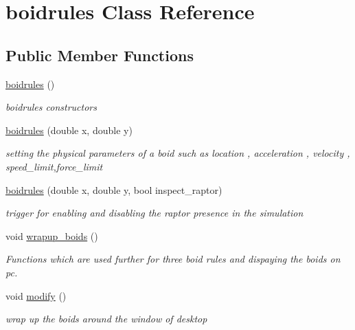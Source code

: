 \hypertarget{classboidrules}{}\section{boidrules Class Reference}
\label{classboidrules}
\subsection*{Public Member Functions}
\begin{DoxyCompactItemize}
\item 
\mbox{\hyperlink{classboidrules_a0fa44ded12febb8a903073fad1205e5b}{boidrules}} ()
\begin{DoxyCompactList}\small\item\em boidrules constructors \end{DoxyCompactList}\item 
\mbox{\label{classboidrules_a3fc6820f3caaf98bfec67c496785ef7d}} 
\mbox{\hyperlink{classboidrules_a3fc6820f3caaf98bfec67c496785ef7d}{boidrules}} (double x, double y)
\begin{DoxyCompactList}\small\item\em setting the physical parameters of a boid such as location , acceleration , velocity , speed\+\_\+limit,force\+\_\+limit \end{DoxyCompactList}\item 
\mbox{\label{classboidrules_ae1c37124f0905e6ae29868a624bcf54b}} 
\mbox{\hyperlink{classboidrules_ae1c37124f0905e6ae29868a624bcf54b}{boidrules}} (double x, double y, bool inspect\+\_\+raptor)
\begin{DoxyCompactList}\small\item\em trigger for enabling and disabling the raptor presence in the simulation \end{DoxyCompactList}\item 
void \mbox{\hyperlink{classboidrules_adeeb0bcb15cc3461fc521ce416d3266e}{wrapup\+\_\+boids}} ()
\begin{DoxyCompactList}\small\item\em Functions which are used further for three boid rules and dispaying the boids on pc. \end{DoxyCompactList}\item 
void \mbox{\hyperlink{classboidrules_a6d350244d405926d30cd36e3f1faa85d}{modify}} ()
\begin{DoxyCompactList}\small\item\em wrap up the boids around the window of desktop \end{DoxyCompactList}\item 

\end{DoxyCompactItemize}
